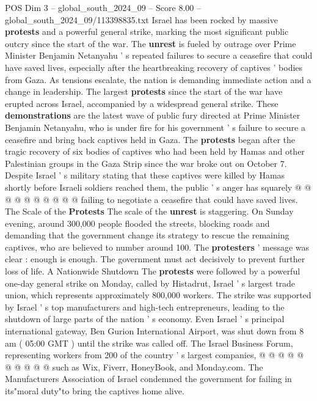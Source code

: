 \begin{textsample}{POS Dim 3 – global\_south\_2024\_09 – Score 8.00 – global\_south\_2024\_09/113398835.txt}  \label{ex:f3_pos_323}
Israel has been rocked by massive \textbf{protests} and a powerful general strike, marking the most significant public outcry since the start of the war.
The \textbf{unrest} is fueled by outrage over Prime Minister Benjamin Netanyahu ' s repeated failures to secure a ceasefire that could have saved lives, especially after the heartbreaking recovery of captives ' bodies from Gaza.
As tensions escalate, the nation is demanding immediate action and a change in leadership.
The largest \textbf{protests} since the start of the war have erupted across Israel, accompanied by a widespread general strike.
These \textbf{demonstrations} are the latest wave of public fury directed at Prime Minister Benjamin Netanyahu, who is under fire for his government ' s failure to secure a ceasefire and bring back captives held in Gaza.
The \textbf{protests} began after the tragic recovery of six bodies of captives who had been held by Hamas and other Palestinian groups in the Gaza Strip since the war broke out on October 7.
Despite Israel ' s military stating that these captives were killed by Hamas shortly before Israeli soldiers reached them, the public ' s anger has squarely @ @ @ @ @ @ @ @ @ @ failing to negotiate a ceasefire that could have saved lives.
The Scale of the \textbf{Protests} The scale of the \textbf{unrest} is staggering.
On Sunday evening, around 300,000 people flooded the streets, blocking roads and demanding that the government change its strategy to rescue the remaining captives, who are believed to number around 100.
The \textbf{protesters} ' message was clear : enough is enough.
The government must act decisively to prevent further loss of life.
A Nationwide Shutdown The \textbf{protests} were followed by a powerful one-day general strike on Monday, called by Histadrut, Israel ' s largest trade union, which represents approximately 800,000 workers.
The strike was supported by Israel ' s top manufacturers and high-tech entrepreneurs, leading to the shutdown of large parts of the nation ' s economy.
Even Israel ' s principal international gateway, Ben Gurion International Airport, was shut down from 8 am ( 05:00 GMT ) until the strike was called off.
The Israel Business Forum, representing workers from 200 of the country ' s largest companies, @ @ @ @ @ @ @ @ @ @ such as Wix, Fiverr, HoneyBook, and Monday.com.
The Manufacturers Association of Israel condemned the government for failing in its"moral duty"to bring the captives home alive.

\end{textsample}
